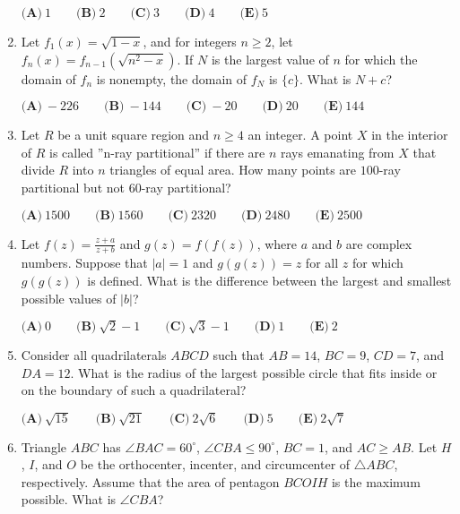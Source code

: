 \documentclass{article}
\begin{document}
\begin{enumerate}[label=\arabic*., itemsep=0.5em]
\(
\textbf{(A)}\ 1 \qquad
\textbf{(B)}\ 2 \qquad
\textbf{(C)}\ 3 \qquad
\textbf{(D)}\ 4 \qquad
\textbf{(E)}\ 5 \)\par \vspace{0.5em}\item Let \(f_{1}(x)=\sqrt{1-x}\), and for integers \(n \geq 2\), let \(f_{n}(x)=f_{n-1}(\sqrt{n^2 - x})\). If \(N\) is the largest value of \(n\) for which the domain of \(f_{n}\) is nonempty, the domain of \(f_{N}\) is \(\{ c\}\). What is \(N+c\)?

\(
\textbf{(A)}\ -226 \qquad
\textbf{(B)}\ -144 \qquad
\textbf{(C)}\ -20 \qquad
\textbf{(D)}\ 20 \qquad
\textbf{(E)}\ 144 \)\par \vspace{0.5em}\item Let \(R\) be a unit square region and \(n \geq 4\) an integer. A point \(X\) in the interior of \(R\) is called ''n-ray partitional'' if there are \(n\) rays emanating from \(X\) that divide \(R\) into \(n\) triangles of equal area. How many points are \(100\)-ray partitional but not \(60\)-ray partitional?

\(
\textbf{(A)}\ 1500 \qquad
\textbf{(B)}\ 1560 \qquad
\textbf{(C)}\ 2320 \qquad
\textbf{(D)}\ 2480 \qquad
\textbf{(E)}\ 2500 \)\par \vspace{0.5em}\item Let \(f(z)= \frac{z+a}{z+b}\) and \(g(z)=f(f(z))\), where \(a\) and \(b\) are complex numbers. Suppose that \(\left| a \right| = 1\) and \(g(g(z))=z\) for all \(z\) for which \(g(g(z))\) is defined. What is the difference between the largest and smallest possible values of \(\left| b \right|\)?

\(
\textbf{(A)}\ 0 \qquad
\textbf{(B)}\ \sqrt{2}-1 \qquad
\textbf{(C)}\ \sqrt{3}-1 \qquad
\textbf{(D)}\ 1 \qquad
\textbf{(E)}\ 2 \)\par \vspace{0.5em}\item Consider all quadrilaterals \(ABCD\) such that \(AB=14\), \(BC=9\), \(CD=7\), and \(DA=12\). What is the radius of the largest possible circle that fits inside or on the boundary of such a quadrilateral?

\(
\textbf{(A)}\ \sqrt{15} \qquad
\textbf{(B)}\ \sqrt{21} \qquad
\textbf{(C)}\ 2\sqrt{6} \qquad
\textbf{(D)}\ 5 \qquad
\textbf{(E)}\ 2\sqrt{7} \)\par \vspace{0.5em}\item Triangle \(ABC\) has \(\angle BAC = 60^{\circ}\), \(\angle CBA \leq 90^{\circ}\), \(BC=1\), and \(AC \geq AB\). Let \(H\), \(I\), and \(O\) be the orthocenter, incenter, and circumcenter of \(\triangle ABC\), respectively. Assume that the area of pentagon \(BCOIH\) is the maximum possible. What is \(\angle CBA\)?


\end{enumerate}
\end{document}
